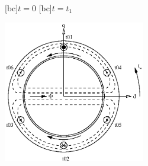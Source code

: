 \begin{psfrags}%
\psfragscanon

[bc]{$t=0$}
[bc]{$t=t_1$}

\includegraphics[height=6.2cm]{figs/f_mmf_rotationa.eps}
\end{psfrags}%
